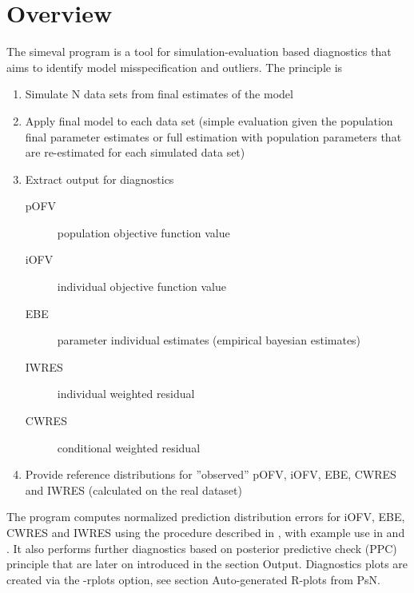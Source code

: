 



\maketitle
\newcommand{\guidetoolname}{simeval}


\section{Overview}

The simeval program is a tool for simulation-evaluation based diagnostics that aims to identify model misspecification and outliers.
The principle is 
\begin{enumerate}
\item Simulate N data sets from final estimates of the model
\item Apply final model to each data set
(simple evaluation given the population final parameter estimates or full estimation with
population parameters that are re-estimated for each simulated data set)
\item Extract output for diagnostics
\begin{description}
\item[pOFV] population objective function value
\item[iOFV] individual objective function value
\item[EBE] parameter individual estimates (empirical bayesian estimates)
\item[IWRES] individual weighted residual
\item[CWRES] conditional weighted residual
\end{description}
\item Provide reference distributions for ”observed” pOFV, iOFV, EBE, CWRES and IWRES (calculated on the real dataset)
\end{enumerate}
The program computes normalized prediction distribution errors for iOFV, EBE, CWRES and IWRES 
using the procedure described in \cite{Comets}, with example use in \cite{Keizer} and \cite{Largajolli}.
It also performs further diagnostics based on posterior predictive check (PPC) principle that are later on introduced in the section Output. Diagnostics plots are created via the -rplots option, see section 
Auto-generated R-plots from PsN.

